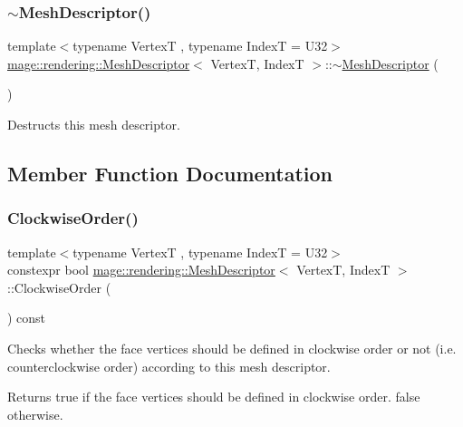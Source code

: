 \subsubsection{\texorpdfstring{$\sim$\+Mesh\+Descriptor()}{~MeshDescriptor()}}
{\footnotesize\ttfamily template$<$typename VertexT , typename IndexT  = U32$>$ \\
\mbox{\hyperlink{classmage_1_1rendering_1_1_mesh_descriptor}{mage\+::rendering\+::\+Mesh\+Descriptor}}$<$ VertexT, IndexT $>$\+::$\sim$\mbox{\hyperlink{classmage_1_1rendering_1_1_mesh_descriptor}{Mesh\+Descriptor}} (\begin{DoxyParamCaption}{ }\end{DoxyParamCaption})\hspace{0.3cm}{\ttfamily [default]}}

Destructs this mesh descriptor. 

\subsection{Member Function Documentation}
\mbox{\label{classmage_1_1rendering_1_1_mesh_descriptor_a71ea285cfb0bc3f748038de570e9084e}} 
\subsubsection{\texorpdfstring{Clockwise\+Order()}{ClockwiseOrder()}}
{\footnotesize\ttfamily template$<$typename VertexT , typename IndexT  = U32$>$ \\
constexpr bool \mbox{\hyperlink{classmage_1_1rendering_1_1_mesh_descriptor}{mage\+::rendering\+::\+Mesh\+Descriptor}}$<$ VertexT, IndexT $>$\+::Clockwise\+Order (\begin{DoxyParamCaption}{ }\end{DoxyParamCaption}) const\hspace{0.3cm}{\ttfamily [noexcept]}}

Checks whether the face vertices should be defined in clockwise order or not (i.\+e. counterclockwise order) according to this mesh descriptor.

\begin{DoxyReturn}{Returns}
{\ttfamily true} if the face vertices should be defined in clockwise order. {\ttfamily false} otherwise. 
\end{DoxyReturn}
\mbox{\label{classmage_1_1rendering_1_1_mesh_descriptor_a0fa7557aa67c69a7978f965bdc913686}} 
